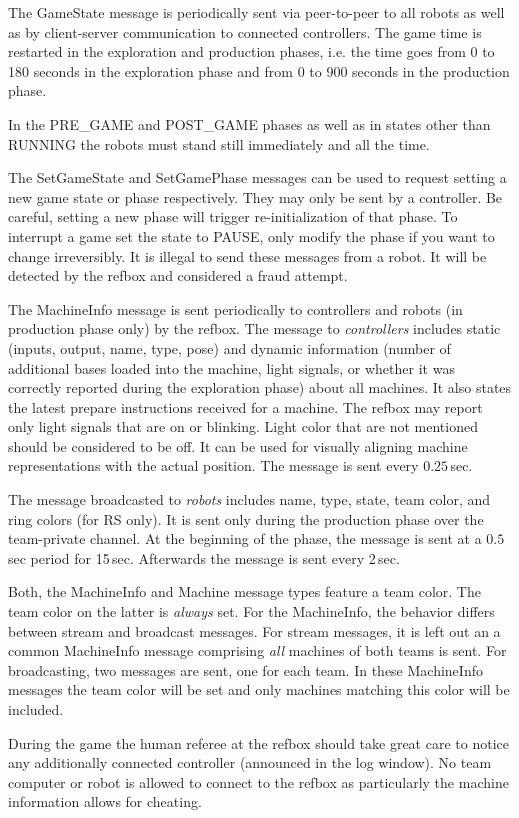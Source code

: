 \documentclass[a4paper]{article}
\begin{document}
%
{%
  The GameState message is periodically sent via peer-to-peer to all
  robots as well as by client-server communication to connected
  controllers. The game time is restarted in the exploration and
  production phases, i.e. the time goes from 0 to 180 seconds in the
  exploration phase and from 0 to 900 seconds in the production phase.

  \medskip

  In the PRE\_GAME and POST\_GAME phases as well as in states other
  than RUNNING the robots must stand still immediately and all the
  time.

  \medskip

  The SetGameState and SetGamePhase messages can be used to request
  setting a new game state or phase respectively. They may only be
  sent by a controller. Be careful, setting a new phase will trigger
  re-initialization of that phase. To interrupt a game set the state
  to PAUSE, only modify the phase if you want to change
  irreversibly. It is illegal to send these messages from a robot. It
  will be detected by the refbox and considered a fraud attempt.
}

%
{%
  The MachineInfo message is sent periodically to controllers and
  robots (in production phase only) by the refbox. The message to
  \emph{controllers} includes static (inputs, output, name, type,
  pose) and dynamic information (number of additional bases loaded
  into the machine, light signals, or whether it was correctly
  reported during the exploration phase) about all machines. It also
  states the latest prepare instructions received for a machine. The
  refbox may report only light signals that are on or blinking. Light
  color that are not mentioned should be considered to be off. It can
  be used for visually aligning machine representations with the
  actual position. The message is sent every $0.25$\,sec.

  The message broadcasted to \emph{robots} includes name, type, state,
  team color, and ring colors (for RS only). It is sent only during
  the production phase over the team-private channel. At the beginning
  of the phase, the message is sent at a $0.5$\,sec period for
  15\,sec. Afterwards the message is sent every 2\,sec.

  \medskip
  Both, the MachineInfo and Machine message types feature a team
  color. The team color on the latter is \emph{always} set. For the
  MachineInfo, the behavior differs between stream and broadcast
  messages. For stream messages, it is left out an a common
  MachineInfo message comprising \emph{all} machines of both teams is
  sent. For broadcasting, two messages are sent, one for each team. In
  these MachineInfo messages the team color will be set and only
  machines matching this color will be included.

  \medskip

  During the game the human referee at the refbox should take great
  care to notice any additionally connected controller (announced in
  the log window). No team computer or robot is allowed to connect to
  the refbox as particularly the machine information allows for
  cheating.
}
\end{document}
